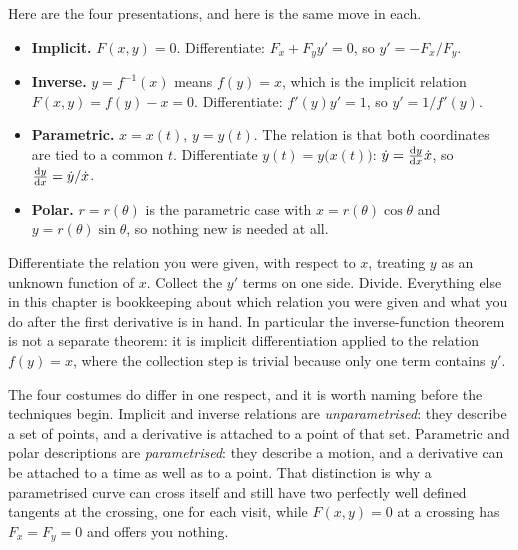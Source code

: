 Here are the four presentations, and here is the same move in each.

\begin{itemize}
\item \textbf{Implicit.} $F(x,y)=0$. Differentiate: $F_{x}+F_{y}y'=0$, so $y'=-F_{x}/F_{y}$.
\item \textbf{Inverse.} $y=f^{-1}(x)$ means $f(y)=x$, which is the implicit relation $F(x,y)=f(y)-x=0$. Differentiate: $f'(y)y'=1$, so $y'=1/f'(y)$.
\item \textbf{Parametric.} $x=x(t)$, $y=y(t)$. The relation is that both coordinates are tied to a common $t$. Differentiate $y(t)=y\bigl(x(t)\bigr)$: $\dot y=\frac{\mathrm{d}y}{\mathrm{d}x}\dot x$, so $\frac{\mathrm{d}y}{\mathrm{d}x}=\dot y/\dot x$.
\item \textbf{Polar.} $r=r(\theta)$ is the parametric case with $x=r(\theta)\cos\theta$ and $y=r(\theta)\sin\theta$, so nothing new is needed at all.
\end{itemize}

\begin{keynote}
Differentiate the relation you were given, with respect to $x$, treating $y$ as an unknown function of $x$. Collect the $y'$ terms on one side. Divide. Everything else in this chapter is bookkeeping about which relation you were given and what you do after the first derivative is in hand. In particular the inverse-function theorem is not a separate theorem: it is implicit differentiation applied to the relation $f(y)=x$, where the collection step is trivial because only one term contains $y'$.
\end{keynote}

The four costumes do differ in one respect, and it is worth naming before the techniques begin. Implicit and inverse relations are \emph{unparametrised}: they describe a set of points, and a derivative is attached to a point of that set. Parametric and polar descriptions are \emph{parametrised}: they describe a motion, and a derivative can be attached to a time as well as to a point. That distinction is why a parametrised curve can cross itself and still have two perfectly well defined tangents at the crossing, one for each visit, while $F(x,y)=0$ at a crossing has $F_{x}=F_{y}=0$ and offers you nothing.


